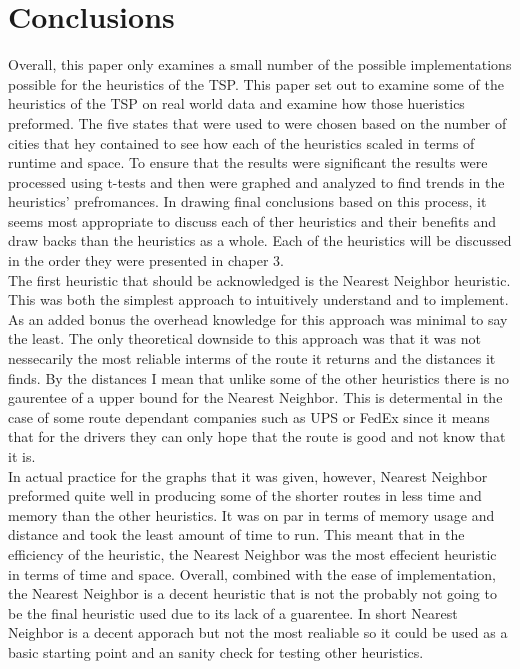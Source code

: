 \documentclass[midd]{thesis}
\newcommand{\tab}{\hspace*{2em}}
\begin{document}
\chapter{Conclusions}
\tab Overall, this paper only examines a small number of the possible implementations possible for the heuristics of the TSP. This paper set out to examine some of the heuristics of the TSP on real world data and examine how those hueristics preformed. The five states that were used to were chosen based on the number of cities that hey contained to see how each of the heuristics scaled in terms of runtime and space. To ensure that the results were significant the results were processed using t-tests and then were graphed and analyzed to find trends in the heuristics' prefromances. In drawing final conclusions based on this process, it seems most appropriate to discuss each of ther heuristics and their benefits and draw backs than the heuristics as a whole. Each of the heuristics will be discussed in the order they were presented in chaper 3.\\
\tab The first heuristic that should be acknowledged is the Nearest Neighbor heuristic. This was both the simplest approach to intuitively understand and to implement. As an added bonus the overhead knowledge for this approach was minimal to say the least. The only theoretical downside to this approach was that it was not nessecarily the most reliable interms of the route it returns and the distances it finds. By the distances I mean that unlike some of the other heuristics there is no gaurentee of a upper bound for the Nearest Neighbor. This is determental in the case of some route dependant companies such as UPS or FedEx since it means that for the drivers they can only hope that the route is good and not know that it is.\\
\tab In actual practice for the graphs that it was given, however, Nearest Neighbor preformed quite well in producing some of the shorter routes in less time and memory than the other heuristics. It was on par in terms of memory usage and distance and took the least amount of time to run. This meant that in the efficiency of the heuristic, the Nearest Neighbor was the most effecient heuristic in terms of time and space. Overall, combined with the ease of implementation, the Nearest Neighbor is a decent heuristic that is not the probably not going to be the final heuristic used due to its lack of a guarentee. In short Nearest Neighbor is a decent apporach but not the most realiable so it could be used as a basic starting point and an sanity check for testing other heuristics.\\
\end{document}

